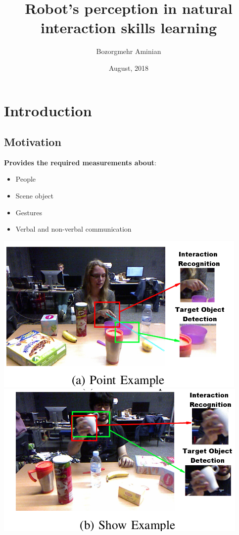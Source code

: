 \documentclass{beamer}
\title{Robot's perception in natural interaction skills learning}
\author{Bozorgmehr Aminian}
\institute{Idiap}
\date{August, 2018}
\begin{document}
\begin{frame}

\titlepage

\end{frame}

\begin{frame}
\tableofcontents
\end{frame}

\section{Introduction}


\subsection{Motivation}
\begin{frame}
\textbf{Provides the required measurements about}:
\begin{itemize}
\item People
\item Scene object
\item Gestures
\item Verbal and non-verbal communication
\end{itemize}
\begin{center}
\includegraphics[scale=0.3]{Pictures/ActionRecognition1.png}
\includegraphics[scale=0.3]{Pictures/ActionRecognition2.png}
\end{center}
\end{frame}
\end{document}
